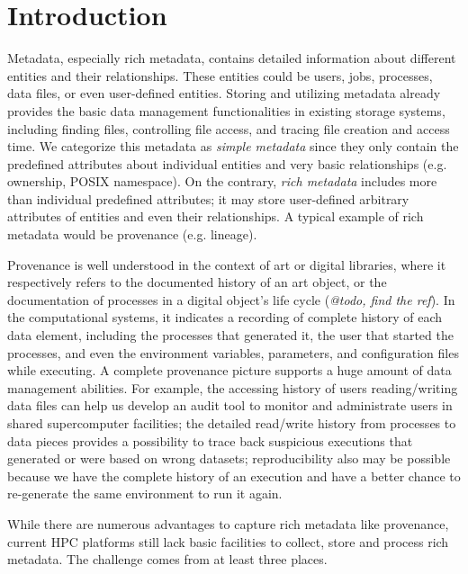 \section{Introduction}

Metadata, especially rich metadata, contains detailed information about different entities and their relationships. These entities could be users, jobs, processes, data files, or even user-defined entities. Storing and utilizing metadata already provides the basic data management functionalities in existing storage systems, including finding files, controlling file access, and tracing file creation and access time. We categorize this metadata as \textit{simple metadata} since they only contain the predefined attributes about individual entities and very basic relationships (e.g. ownership, POSIX namespace). On the contrary, \textit{rich metadata} includes more than individual predefined attributes; it may store user-defined arbitrary attributes of entities and even their relationships. A typical example of rich metadata would be provenance (e.g. lineage). 

Provenance is well understood in the context of art or digital libraries, where it respectively refers to the documented history of an art object, or the documentation of processes in a digital object's life cycle (\textit{@todo, find the ref}). In the computational systems, it indicates a recording of complete history of each data element, including the processes that generated it, the user that started the processes, and even the environment variables, parameters, and configuration files while executing. A complete provenance picture supports a huge amount of data management abilities. For example, the  accessing history of users reading/writing data files can help us develop an audit tool to monitor and administrate users in shared supercomputer facilities; the detailed read/write history from processes to data pieces provides a possibility to trace back suspicious executions that generated or were based on wrong datasets; reproducibility also may be possible because we have the complete history of an execution and have a better chance to re-generate the same environment to run it again. 

While there are numerous advantages to capture rich metadata like provenance, current HPC platforms still lack basic facilities to collect, store and process rich metadata. The challenge comes from at least three places.

